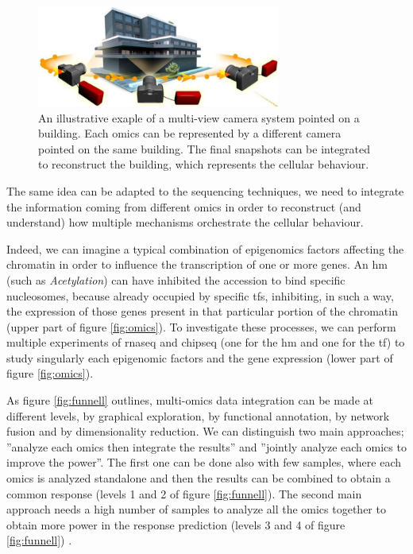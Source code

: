\begin{figure}[h]
\centering
\includegraphics[width=8cm, keepaspectratio]{img/intro/cameras.png}
\caption[Integration cameras]{An illustrative exaple of a multi-view camera system pointed on a building.
Each omics can be represented by a different camera pointed on the same building. 
The final snapshots can be integrated to reconstruct the building, which represents the cellular behaviour.}
\label{fig:cameras}
\end{figure}

The same idea can be adapted to the sequencing techniques, we need to integrate the information coming from different omics in order to reconstruct (and understand) how multiple mechanisms orchestrate the cellular behaviour.

Indeed, we can imagine a typical combination of epigenomics factors affecting the chromatin in order to influence the transcription of one or more genes.
An \gls{hm} (such as \textit{Acetylation}) can have inhibited the accession to bind specific nucleosomes, because already occupied by specific \glspl{tf}, inhibiting, in such a way, the expression of those genes present in that particular portion of the chromatin (upper part of figure \ref{fig:omics}).
To investigate these processes, we can perform multiple experiments of \gls{rnaseq} and \gls{chipseq} (one for the \gls{hm} and one for the \gls{tf}) to study singularly each epigenomic factors and the gene expression (lower part of figure \ref{fig:omics}). 

As figure \ref{fig:funnell} outlines, multi-omics data integration can be made at different levels, by graphical exploration, by functional annotation, by network fusion and by dimensionality reduction.
We can distinguish two main approaches; ''analyze each omics then integrate the results'' and ''jointly analyze each omics to improve the power''.
The first one can be done also with few samples, where each omics is analyzed standalone and then the results can be combined to obtain a common response (levels 1 and 2 of figure \ref{fig:funnell}).
The second main approach needs a high number of samples to analyze all the omics together to obtain more power in the response prediction (levels 3 and 4 of figure \ref{fig:funnell}) \cite{Rohart2017, Argelaguet2018, Jia2017, Meng2016}.

